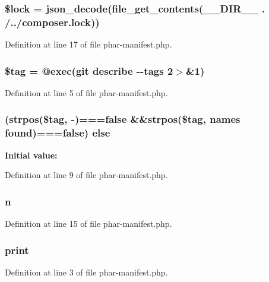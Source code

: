 \subsubsection[{\$lock}]{\setlength{\rightskip}{0pt plus 5cm}\$lock = json\+\_\+decode(file\+\_\+get\+\_\+contents(\+\_\+\+\_\+\+D\+I\+R\+\_\+\+\_\+ . \textquotesingle{}/../composer.\+lock\textquotesingle{}))}\label{phar-manifest_8php_af42e78ece9ec638f2928b3bef452d3e1}


Definition at line 17 of file phar-\/manifest.\+php.

\subsubsection[{\$tag}]{\setlength{\rightskip}{0pt plus 5cm}\$tag = @exec(\textquotesingle{}git describe -\/-\/tags 2$>$\&1\textquotesingle{})}\label{phar-manifest_8php_a81d5015d41ed8ec66e9db8cdc5db9555}


Definition at line 5 of file phar-\/manifest.\+php.

\subsubsection[{else}]{ (strpos(\$tag, \textquotesingle{}-\/\textquotesingle{})===false \&\&strpos(\$tag,  names found\textquotesingle{})===false) else}\label{phar-manifest_8php_acff5816afe13996fa16f3855b621f4ec}
{\bfseries Initial value\+:}


Definition at line 9 of file phar-\/manifest.\+php.

\subsubsection[{n}]{ n}\label{phar-manifest_8php_ab1b2829a7425bcec97d0ab4e6b3c77f2}


Definition at line 15 of file phar-\/manifest.\+php.

\subsubsection[{print}]{\setlength{\rightskip}{0pt plus 5cm}print}\label{phar-manifest_8php_a3ad3a4240c0f97c7e85aff5c52a454d4}


Definition at line 3 of file phar-\/manifest.\+php.

